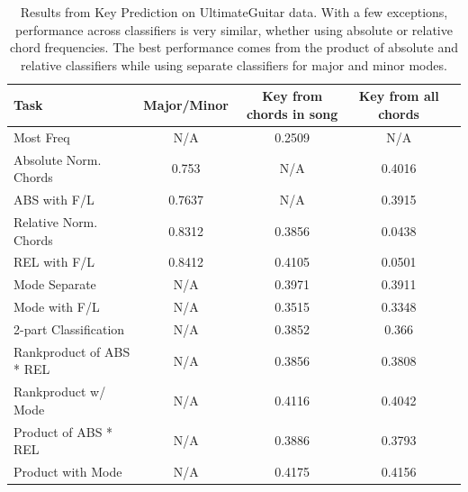 \documentclass[letterpaper]{article}
\begin{document}
\begin{table}[t]
\centering
\caption{Results from Key Prediction on UltimateGuitar data.  With a few exceptions, performance across classifiers is very similar, whether using absolute or relative chord frequencies.  The best performance comes from the product of absolute and relative classifiers while using separate classifiers for major and minor modes.}
\label{my-label}
\begin{tabular}{lcccc}
Task & Major/Minor &  Key from chords in song &  Key from all chords \\ \hline   
Most Freq                               & N/A                 & 0.2509                                                                        & N/A                                      \\
Absolute Norm. Chords                                             & 0.753               & N/A                                                                           & 0.4016                               \\
ABS with F/L                                                      & 0.7637              & N/A                                                                           & 0.3915  \\
Relative Norm. Chords                                             & 0.8312              & 0.3856                                                                        & 0.0438   \\
REL with F/L                                                      & 0.8412              & 0.4105                                                                        & 0.0501  \\
Mode Separate                                                     & N/A                 & 0.3971                                                                        & 0.3911\\
Mode with F/L                                                     & N/A                 & 0.3515                                                                        & 0.3348 \\
2-part Classification                                             & N/A                 & 0.3852                                                                        & 0.366 \\
Rankproduct of ABS * REL                                          & N/A                 & 0.3856                                                                        & 0.3808  \\
Rankproduct w/ Mode & N/A                 & 0.4116                                                                        & 0.4042 \\
Product of ABS * REL  & N/A                 & 0.3886                                                                        & 0.3793 \\
Product with Mode     & N/A                 & 0.4175                                                                        & 0.4156                                 
\end{tabular}
\end{table}
\end{document}
